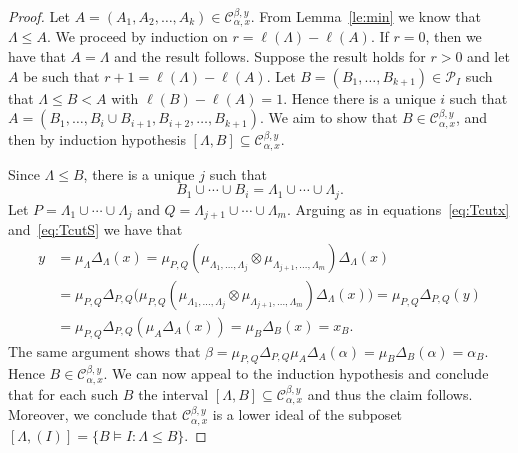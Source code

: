 \documentclass[10pt]{amsart}
\theoremstyle{definition}
\begin{document}
\begin{proof} Let $A=(A_1,A_2,\ldots,A_k)\in \mathcal{C}_{\alpha,x}^{\beta,y}$. From Lemma~\ref{le:min} we know that $\Lambda\le A$. We proceed by induction on $r = \ell(\Lambda)-\ell(A)$.
If $r=0$, then we have that $A=\Lambda$ and the result follows.
Suppose the result holds for $r>0$ and let $A$ be such that $r+1= \ell(\Lambda)-\ell(A)$. Let $B=(B_1,\dots,B_{k+1})\in \mathcal{P}_I$ such that $\Lambda\leq B< A$ with $\ell(B)-\ell(A)=1$. Hence there is a unique $i$ such that $A=(B_1,\ldots,B_i\cup B_{i+1},B_{i+2},\ldots,B_{k+1})$. We aim to show that $B\in\mathcal{C}_{\alpha,x}^{\beta,y}$, and then by induction hypothesis $[\Lambda,B]\subseteq \mathcal{C}_{\alpha,x}^{\beta,y}$. 

Since $\Lambda\le B$, there is a unique $j$ such that 
 $$ B_1\cup\cdots\cup B_i=\Lambda_1\cup\cdots\cup \Lambda_j.$$
Let $P=\Lambda_1\cup\cdots\cup \Lambda_j$ and $Q=\Lambda_{j+1}\cup\cdots\cup \Lambda_m$. Arguing as in equations~\eqref{eq:Tcutx} and~\eqref{eq:TcutS} we have that 
 $$
 \begin{aligned}
 y&=\mu_\Lambda\Delta_\Lambda(x)=\mu_{P,Q}(\mu_{\Lambda_1,\ldots, \Lambda_j}\otimes \mu_{\Lambda_{j+1},\ldots, \Lambda_m})\Delta_\Lambda(x)\\
 &=\mu_{P,Q}\Delta_{P,Q}\big(\mu_{P,Q}(\mu_{\Lambda_1,\ldots, \Lambda_j}\otimes \mu_{\Lambda_{j+1},\ldots, \Lambda_m})\Delta_\Lambda(x)\big)
 =\mu_{P,Q}\Delta_{P,Q}(y)\\
 &=\mu_{P,Q}\Delta_{P,Q}(\mu_A\Delta_A(x))= \mu_B\Delta_B(x)=x_B.
 \end{aligned}
 $$
 The same argument shows that $\beta=\mu_{P,Q}\Delta_{P,Q}\mu_A\Delta_A(\alpha)= \mu_B\Delta_B(\alpha)=\alpha_B$. Hence $B\in \mathcal{C}_{\alpha,x}^{\beta,y}$. We can now appeal to the induction hypothesis and conclude that for each such $B$ the interval $[\Lambda,B]\subseteq \mathcal{C}_{\alpha,x}^{\beta,y}$ and thus the claim follows. Moreover, we conclude that $\mathcal{C}_{\alpha,x}^{\beta,y}$ is a lower ideal of the subposet
 $[\Lambda,(I)]=\{B\models I : \Lambda \le B\}$.
\end{proof}
\end{document}
